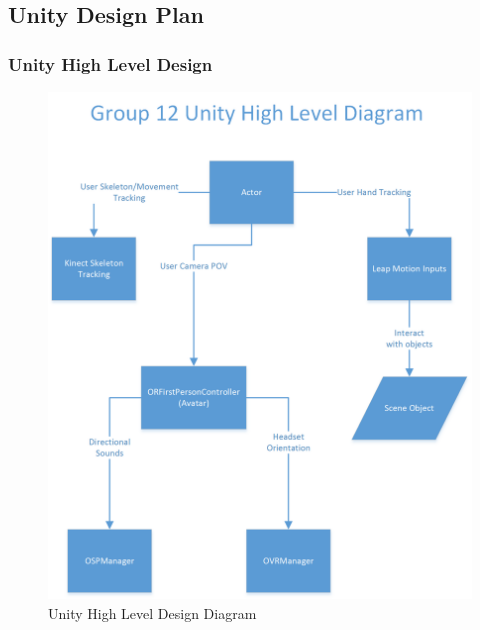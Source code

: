 \documentclass[a4paper,10pt]{article}
\begin{document}
\pagebreak
	\subsection{Unity Design Plan}
		\subsubsection{Unity High Level Design}
		\begin{figure}[H]
					\centerline{\includegraphics[]{UnityHighlevel.png}}
					\caption{Unity High Level Design Diagram}
					\label{fig:unitydesign}
				\end{figure}
				
		\pagebreak
\end{document}
